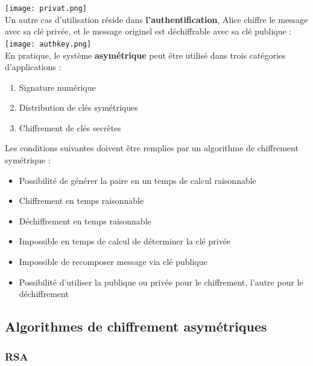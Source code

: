 \documentclass{report}
\begin{document}
		\texttt{[image: privat.png]}\\

		Un autre cas d'utilisation réside dans \textbf{l'authentification}, Alice chiffre le message avec sa clé privée, et le message originel est déchiffrable avec sa clé publique : \\

		\texttt{[image: authkey.png]}\\

		En pratique, le système \textbf{asymétrique} peut être utilisé dans trois catégories d'applications : \\

		\begin{enumerate}
		 	\item Signature numérique
		 	\item Distribution de clés symétriques
		 	\item Chiffrement de clés secrètes\\
		 \end{enumerate}

		 Les conditions suivantes doivent être remplies par un algorithme de chiffrement symétrique : \\

		 \begin{itemize}
		 	\item Possibilité de générer la paire en un temps de calcul raisonnable
		 	\item Chiffrement en temps raisonnable
		 	\item Déchiffrement en temps raisonnable
		 	\item Impossible en temps de calcul de déterminer la clé privée
		 	\item Impossible de recomposer message via clé publique
		 	\item Possibilité d'utiliser la publique ou privée pour le chiffrement, l'autre pour le déchiffrement\\
		 \end{itemize}

		 \subsection{Algorithmes de chiffrement asymétriques}

		 	\subsubsection{RSA}
\end{document}
